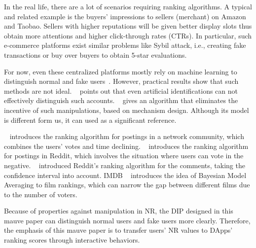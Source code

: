 In the real life, there are a lot of scenarios requiring ranking algorithms. A typical and related example is the buyers' impressions to sellers (merchant) on Amazon and Taobao. Sellers with higher reputations will be given better display slots thus obtain more attentions and higher click-through rates (CTRs). In particular, such e-commerce platforms exist similar problems like Sybil attack, i.e., creating fake transactions or buy over buyers to obtain 5-star evaluations. 

For now, even these centralized platforms mostly rely on machine learning to distinguish normal and fake users~\cite{mukherjee2013spotting,jindal2008opinion,yoo2009comparison}. However, practical results show that such methods are not ideal. ~\cite{ott2011finding} points out that even artificial identifications can not effectively distinguish such accounts. ~\cite{cai2016mechanism} gives an algorithm that eliminates the incentive of such manipulations, based on mechanism design. Although its model is different form us, it can used as a significant reference.

~\cite{salihefendic2010hacker} introduces the ranking algorithm for postings in a network community, which combines the users' votes and time declining. ~\cite{salihefendic2010reddit} introduces the ranking algorithm for postings in Reddit, which involves the situation where users can vote in the negative. 
~\cite{miller2009how} introduced Reddit's ranking algorithm for the comments, taking the confidence interval into account.
IMDB ~\cite {IMDB} introduces the idea of Bayesian Model Averaging to film rankings, which can narrow the gap between different films due to the number of voters.

Because of properties against manipulation in NR, the DIP designed in this mauve paper can distinguish normal users and fake users more clearly. Therefore, the emphasis of this mauve paper is to transfer users' NR values to DApps' ranking scores through interactive behaviors.


